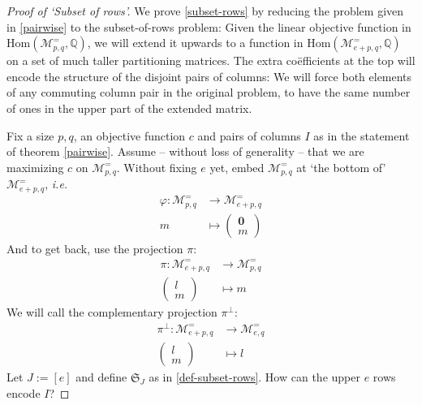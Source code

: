 \documentclass[a4paper]{amsart}
\theoremstyle{definition}
\theoremstyle{remark}
\def\ie{\emph{i.e.}}
\newcommand{\lr}[1]{\ensuremath{\left( #1 \right)}}
\newcommand{\lrE}[1]{\ensuremath{\left[ #1 \right]}}
\newcommand{\rationals}{\ensuremath{\mathbb{Q}}}
\newcommand{\Hom}{\ensuremath{\mathrm{Hom}}}
\newcommand{\M}{\ensuremath{\mathcal{M}}}
\newcommand{\Sym}{\ensuremath{\mathfrak{S}}}
\begin{document}
\begin{proof}[Proof of `Subset of rows']
  We prove \ref{subset-rows} by reducing the problem given in
  \ref{pairwise} to the subset-of-rows problem: Given the linear
  objective function in \(\Hom \lr{\M^=_{p, q}, \rationals} \), we
  will extend it upwards to a function in \(\Hom \lr{\M^=_{e+p, q},
    \rationals}\) on a set of much taller partitioning matrices.  The
  extra co\"efficients at the top will encode the structure of the
  disjoint pairs of columns: We will force both elements of any
  commuting column pair in the original problem, to have the same
  number of ones in the upper part of the extended matrix.

  Fix a size \(p, q\), an objective function \(c\) and pairs of
  columns \(I\) as in the statement of theorem \ref{pairwise}.  Assume
  -- without loss of generality -- that we are maximizing \(c\) on
  \(\M^=_{p,q}\).  Without fixing \(e\) yet, embed \(\M^=_{p,q}\) at
  `the bottom of' \(\M^=_{e+p,q}\), \ie
  \begin{align}
    \varphi \colon \M^=_{p,q} & \to \M^=_{e+p,q} \\
    \nonumber
     m & \mapsto \lr{\begin{matrix}
       \mathbf{0} \\
       m
     \end{matrix}}
 \end{align}
 And to get back, use the projection \(\pi\):
 \begin{align}
   \pi \colon \M^=_{e+p,q} & \to \M^=_{p,q} \\
    \nonumber
     \lr{\begin{matrix}
         l \\
         m
     \end{matrix}} & \mapsto m
  \end{align}
  We will call the complementary projection \(\pi^\bot\):
  \begin{align}
    \pi^\bot \colon \M^=_{e+p,q} & \to \M^=_{e,q} \\
    \nonumber
    \lr{\begin{matrix}
        l \\
        m
      \end{matrix}} & \mapsto l
  \end{align}
  Let \(J := \lrE{e}\) and define \(\Sym_{J}\) as in
  \ref{def-subset-rows}.  How can the upper \(e\) rows encode \(I\)?
  

\end{proof}
\end{document}
